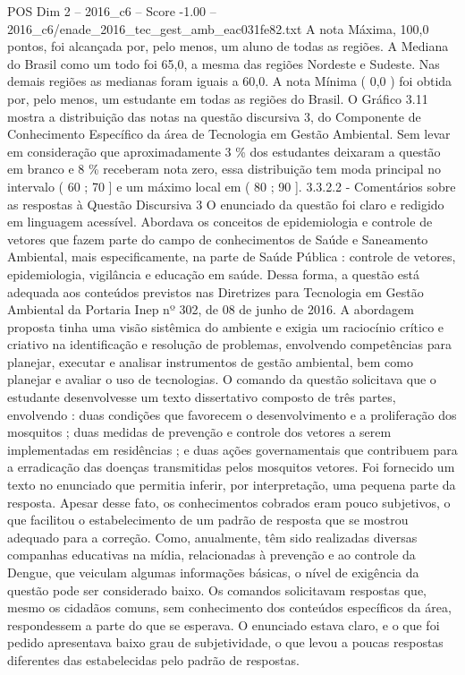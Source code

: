 \begin{textsample}{POS Dim 2 – 2016\_c6 – Score -1.00 – 2016\_c6/enade\_2016\_tec\_gest\_amb\_eac031fe82.txt}
A nota Máxima, 100,0 pontos, foi alcançada por, pelo menos, um aluno de todas as regiões.
A Mediana do Brasil como um todo foi 65,0, a mesma das regiões Nordeste e Sudeste.
Nas demais regiões as medianas foram iguais a 60,0.
A nota Mínima ( 0,0 ) foi obtida por, pelo menos, um estudante em todas as regiões do Brasil.
O Gráfico 3.11 mostra a distribuição das notas na questão discursiva 3, do Componente de Conhecimento Específico da área de Tecnologia em Gestão Ambiental.
Sem levar em consideração que aproximadamente 3 \% dos estudantes deixaram a questão em branco e 8 \% receberam nota zero, essa distribuição tem moda principal no intervalo ( 60 ; 70 ] e um máximo local em ( 80 ; 90 ]. 3.3.2.2 - Comentários sobre as respostas à Questão Discursiva 3 O enunciado da questão foi claro e redigido em linguagem acessível.
Abordava os conceitos de epidemiologia e controle de vetores que fazem parte do campo de conhecimentos de Saúde e Saneamento Ambiental, mais especificamente, na parte de Saúde Pública : controle de vetores, epidemiologia, vigilância e educação em saúde.
Dessa forma, a questão está adequada aos conteúdos previstos nas Diretrizes para Tecnologia em Gestão Ambiental da Portaria Inep nº 302, de 08 de junho de 2016.
A abordagem proposta tinha uma visão sistêmica do ambiente e exigia um raciocínio crítico e criativo na identificação e resolução de problemas, envolvendo competências para planejar, executar e analisar instrumentos de gestão ambiental, bem como planejar e avaliar o uso de tecnologias.
O comando da questão solicitava que o estudante desenvolvesse um texto dissertativo composto de três partes, envolvendo : duas condições que favorecem o desenvolvimento e a proliferação dos mosquitos ; duas medidas de prevenção e controle dos vetores a serem implementadas em residências ; e duas ações governamentais que contribuem para a erradicação das doenças transmitidas pelos mosquitos vetores.
Foi fornecido um texto no enunciado que permitia inferir, por interpretação, uma pequena parte da resposta.
Apesar desse fato, os conhecimentos cobrados eram pouco subjetivos, o que facilitou o estabelecimento de um padrão de resposta que se mostrou adequado para a correção.
Como, anualmente, têm sido realizadas diversas companhas educativas na mídia, relacionadas à prevenção e ao controle da Dengue, que veiculam algumas informações básicas, o nível de exigência da questão pode ser considerado baixo.
Os comandos solicitavam respostas que, mesmo os cidadãos comuns, sem conhecimento dos conteúdos específicos da área, respondessem a parte do que se esperava.
O enunciado estava claro, e o que foi pedido apresentava baixo grau de subjetividade, o que levou a poucas respostas diferentes das estabelecidas pelo padrão de respostas.

\end{textsample}
